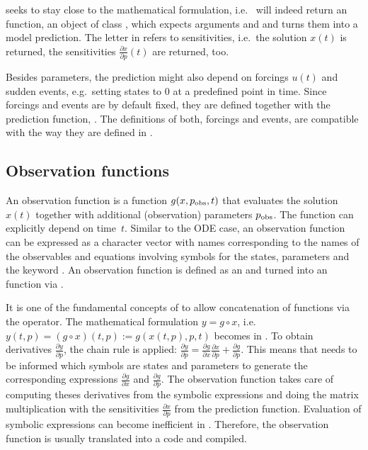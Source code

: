 \documentclass[article]{jss}
\begin{document}
 seeks to stay close to the mathematical formulation, i.e.~ will indeed return an  function, an object of class , which expects arguments  and  and turns them into a model prediction. The letter  in  refers to sensitivities, i.e.~the solution $x(t)$ is returned, the sensitivities $\frac{\partial x}{\partial p}(t)$ are returned, too.

Besides parameters, the prediction might also depend on forcings $u(t)$ and sudden events, e.g.~setting states to 0 at a predefined point in time. Since forcings and events are by default fixed, they are defined together with the  prediction function, . The definitions of both, forcings and events, are compatible with the way they are defined in .

\subsection{Observation functions}


An observation function is a function $g(x, p_{\rm obs}, t)$ that evaluates the solution $x(t)$ together with additional (observation) parameters $p_{\rm obs}$. The function can explicitly depend on time~$t$. Similar to the ODE case, an observation function can be expressed as a character vector with names corresponding to the names of the observables and equations involving symbols for the states, parameters and the keyword . An observation function is defined as an  and turned into an  function via .

It is one of the fundamental concepts of  to allow concatenation of functions via the  operator. The mathematical formulation $y = g\circ x$, i.e.~$y(t, p) = (g\circ x)(t, p):= g(x(t, p), p, t)$ becomes  in . To obtain derivatives $\frac{\partial y}{\partial p}$, the chain rule is applied: $\frac{\partial y}{\partial p} = \frac{\partial g}{\partial x}\frac{\partial x}{\partial p} + \frac{\partial g}{\partial p}$. This means that  needs to be informed which symbols are states and parameters to generate the corresponding expressions $\frac{\partial g}{\partial x}$ and $\frac{\partial g}{\partial p}$. The observation function  takes care of computing theses derivatives from the symbolic expressions and doing the matrix multiplication with the sensitivities $\frac{\partial x}{\partial p}$ from the prediction function. Evaluation of symbolic expressions can become inefficient in . Therefore, the observation function is usually translated into a  code and compiled.
\end{document}
